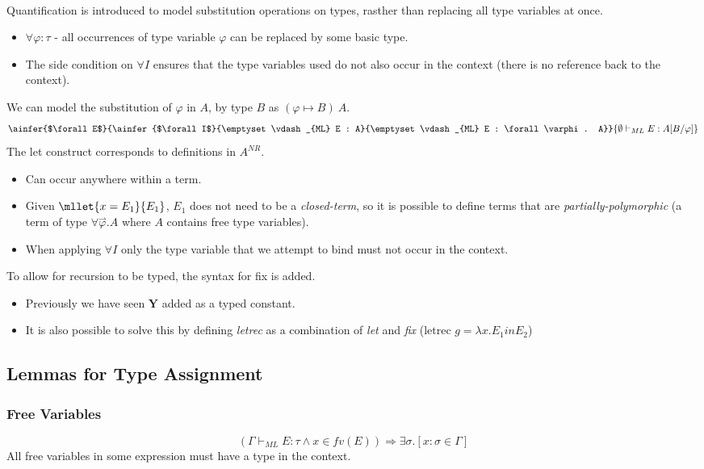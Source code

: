 \vspace{5mm}
\\ Quantification is introduced to model substitution operations on types, rasther than replacing all type variables at once.
\begin{itemize}
    \item $\forall \varphi : \tau$ - all occurrences of type variable $\varphi$ can be replaced by some basic type.
    \item The side condition on $\forall I$ ensures that the type variables used do not also occur in the context (there is no reference back to the context).
\end{itemize}
We can model the substitution of $\varphi$ in $A$, by type $B$ as $(\varphi \mapsto B) \ A$.
\[\ainfer{$\forall E$}{\ainfer{$\forall I$}{\emptyset \vdash_{ML} E : A}{\emptyset \vdash_{ML} E : \forall \varphi . A}}{\emptyset \vdash_{ML} E : A [B/\varphi]}\]
The let construct corresponds to definitions in $A^{NR}$.
\begin{itemize}
    \item Can occur anywhere within a term.
    \item Given $\mllet{x = E_1}{E_1}$, $E_1$ does not need to be a \textit{closed-term}, so it is possible to define terms that are \textit{partially-polymorphic} (a term of type $\forall \overset{\rightharpoonup}{\varphi} . A$ where $A$ contains free type variables).
    \item When applying $\forall I$ only the type variable that we attempt to bind must not occur in the context.
\end{itemize}
To allow for recursion to be typed, the syntax for fix is added.
\begin{itemize}
    \item Previously we have seen $\mathbf{Y}$ added as a typed constant.
    \item It is also possible to solve this by defining \textit{letrec} as a combination of \textit{let} and \textit{fix} ($\text{letrec } g = \lambda x . E_1 in E_2$)
\end{itemize}
\subsection{Lemmas for Type Assignment}
\subsubsection{Free Variables}
\[(\Gamma \vdash_{ML} E : \tau \land x \in fv(E)) \Rightarrow \exists \sigma . [x: \sigma \in \Gamma]\]
All free variables in some expression must have a type in the context.
